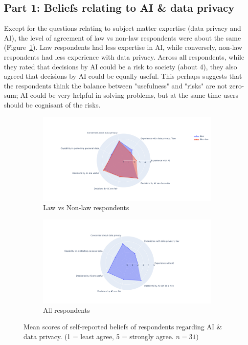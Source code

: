 \subsection{Part 1: Beliefs relating to AI \& data privacy}
Except for the questions relating to subject matter expertise (data privacy and AI), the level of agreement of law vs non-law respondents were about the same (Figure~\ref{fig:demo_3}). Law respondents had less expertise in AI, while conversely, non-law respondents had less experience with data privacy. Across all respondents, while they rated that decisions by AI could be a risk to society (about 4), they also agreed that decisions by AI could be equally useful. This perhaps suggests that the respondents think the balance between "usefulness" and "risks" are not zero-sum; AI could be very helpful in solving problems, but at the same time users should be cognisant of the risks.

\begin{figure}[!ht]
    \begin{subfigure}[b]{1\textwidth}
      \centering
      \includegraphics[width=1\linewidth]{figures/demo_3.png}
      \caption{Law vs Non-law respondents}
    \end{subfigure}
    \hfill
    \begin{subfigure}[b]{1\textwidth}
      \centering
      \includegraphics[width=1\linewidth]{figures/demo_4.png}
      \caption{All respondents}
    \end{subfigure}
    \caption{Mean scores of self-reported beliefs of respondents regarding AI \& data privacy. (1 = least agree, 5 = strongly agree. $n=31$)}
    \label{fig:demo_3}
\end{figure}

